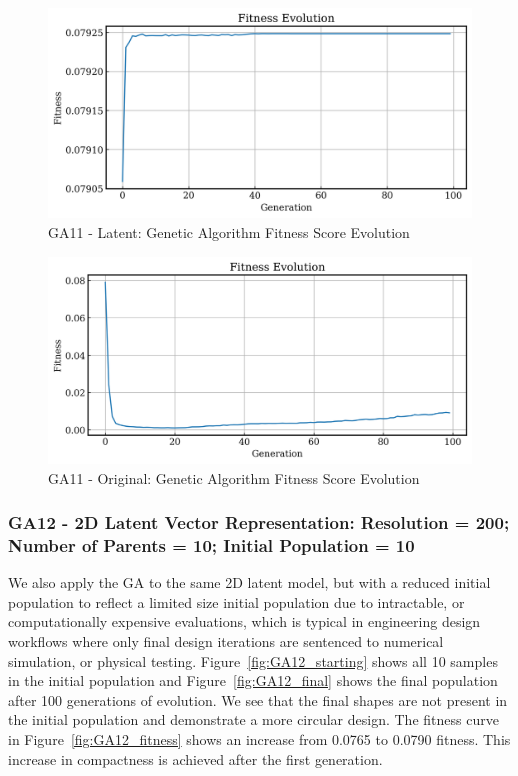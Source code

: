 \documentclass{article}
\begin{document}
\begin{figure}[H]
    \centering
    \includegraphics[width=0.75\linewidth]{figures/GAResults/GA11/latent/100gen_fitness.png}
    \caption{GA11 - Latent: Genetic Algorithm Fitness Score Evolution}
    \label{fig:GA11_latent_fitness}
\end{figure}

\begin{figure}[H]
    \centering
    \includegraphics[width=0.75\linewidth]{figures/GAResults/GA11/original/original_200n_fitness.png}
    \caption{GA11 - Original: Genetic Algorithm Fitness Score Evolution}
    \label{fig:GA11_original_fitness}
\end{figure}

\subsubsection*{GA12 - 2D Latent Vector Representation: Resolution = 200; Number of Parents = 10; Initial Population = 10}

We also apply the GA to the same 2D latent model, but with a reduced initial population to reflect a limited size initial population due to intractable, or computationally expensive evaluations, which is typical in engineering design workflows where only final design iterations are sentenced to numerical simulation, or physical testing. 
Figure~\ref{fig:GA12_starting} shows all 10 samples in the initial population and Figure~\ref{fig:GA12_final} shows the final population after 100 generations of evolution. We see that the final shapes are not present in the initial population and demonstrate a more circular design. The fitness curve in Figure~\ref{fig:GA12_fitness} shows an increase from 0.0765 to 0.0790 fitness. This increase in compactness is achieved after the first generation.
\end{document}
